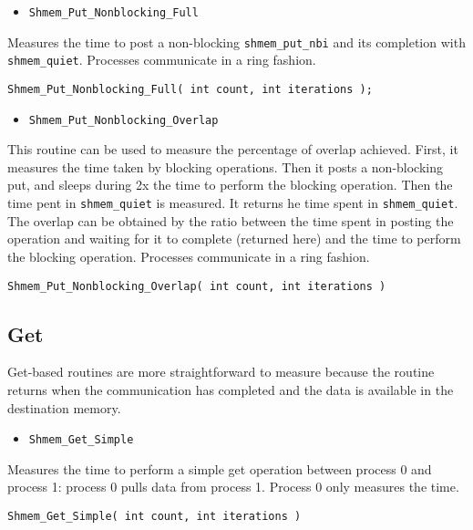 \documentclass[12pt, letterpaper]{article}
\begin{document}
\begin{itemize}
    \item {\tt Shmem\_Put\_Nonblocking\_Full}
\end{itemize}

Measures the time to post a non-blocking {\tt shmem\_put\_nbi} and its completion with {\tt shmem\_quiet}. Processes communicate in a ring fashion.

\begin{lstlisting}
Shmem_Put_Nonblocking_Full( int count, int iterations );
\end{lstlisting}

\begin{itemize}
    \item {\tt Shmem\_Put\_Nonblocking\_Overlap}
\end{itemize}

This routine can be used to measure the percentage of overlap achieved. First, it measures the time taken by blocking operations. Then it posts a non-blocking put, and sleeps during 2x the time to perform the blocking operation. Then the time pent in {\tt shmem\_quiet} is measured. It returns he time spent in {\tt shmem\_quiet}. The overlap can be obtained by the ratio between the time spent in posting the operation and waiting for it to complete (returned here) and the time to perform the blocking operation. Processes communicate in a ring fashion. 

\begin{lstlisting}
Shmem_Put_Nonblocking_Overlap( int count, int iterations )
\end{lstlisting}

\subsection{Get}

Get-based routines are more straightforward to measure because the routine returns when the communication has completed and the data is available in the destination memory. 

\begin{itemize}
    \item {\tt Shmem\_Get\_Simple}
\end{itemize}

Measures the time to perform a simple get operation between process 0 and process 1: process 0 pulls data from process 1. Process 0 only measures the time.

\begin{lstlisting}
Shmem_Get_Simple( int count, int iterations )
\end{lstlisting}
\end{document}
